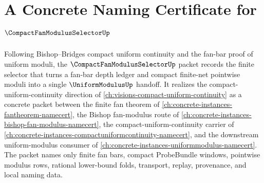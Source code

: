 \chapter{A Concrete Naming Certificate for $\CompactFanModulusSelectorUp$}
\label{ch:concrete-instances-compact-fan-modulus-selector-namecert}

Following Bishop--Bridges compact uniform continuity and the fan-bar proof of uniform moduli, the $\CompactFanModulusSelectorUp$ packet records the finite selector that turns a fan-bar depth ledger and compact finite-net pointwise moduli into a single $\UniformModulusUp$ handoff. It realizes the compact-uniform-continuity direction of \autoref{ch:visions-compact-uniform-continuity} as a concrete packet between the finite fan theorem of \autoref{ch:concrete-instances-fantheorem-namecert}, the Bishop fan-modulus route of \autoref{ch:concrete-instances-bishop-fan-modulus-namecert}, the compact-uniform-continuity carrier of \autoref{ch:concrete-instances-compactuniformcontinuity-namecert}, and the downstream uniform-modulus consumer of \autoref{ch:concrete-instances-uniformmodulus-namecert}. The packet names only finite fan bars, compact ProbeBundle windows, pointwise modulus rows, rational lower-bound folds, transport, replay, provenance, and local naming data.

